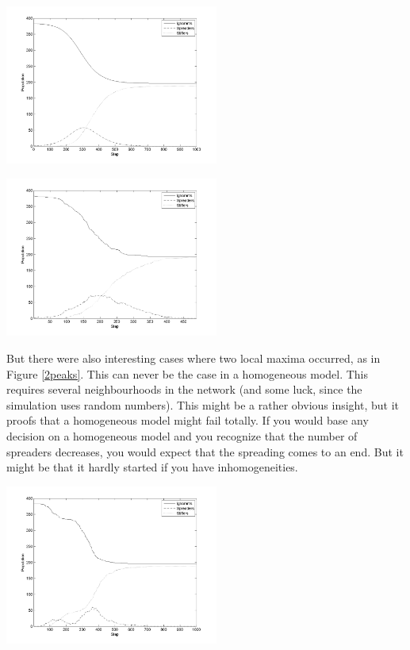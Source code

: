 \begin{minipage}{0.5\textwidth}
\includegraphics[width=7cm]{NICE_SIR}
\end{minipage}
\begin{minipage}{0.5\textwidth}
\includegraphics[width=7cm]{1-local-max}
\end{minipage}
\label{evolution1}


\begin{minipage}{0.5\textwidth}
But there were also interesting cases where two local maxima occurred, as in Figure \ref{2peaks}. This can never be the case in a homogeneous model. This requires several neighbourhoods in the network (and some luck, since the simulation uses random numbers). This might be a rather obvious insight, but it proofs that a homogeneous model might fail totally. If you would base any decision on a homogeneous model and you recognize that the number of spreaders decreases, you would expect that the spreading comes to an end. But it might be  that it hardly started if you have inhomogeneities.
\end{minipage}
\begin{minipage}{0.5\textwidth}
\includegraphics[width=7cm]{2-local-max}
\label{2peaks}
\end{minipage}



